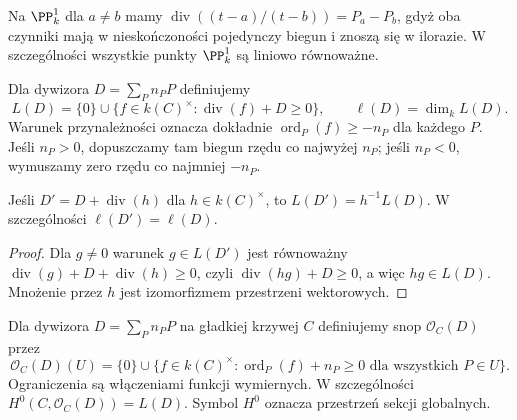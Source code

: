 \begin{przyklad}
Na $\PP^1_k$ dla $a\ne b$ mamy
$\operatorname{div}((t-a)/(t-b))=P_a-P_b$,
gdyż oba czynniki mają w nieskończoności
pojedynczy biegun i znoszą się w ilorazie.
W szczególności wszystkie punkty $\PP^1_k$
są liniowo równoważne.
\end{przyklad}

\begin{definicja}
Dla dywizora $D=\sum_Pn_PP$ definiujemy
\[
 L(D)=\{0\}\cup\{f\in k(C)^\times:
 \operatorname{div}(f)+D\ge0\},\qquad
 \ell(D)=\dim_k L(D).
\]
Warunek przynależności oznacza dokładnie
$\operatorname{ord}_P(f)\ge-n_P$ dla każdego $P$.
Jeśli $n_P>0$, dopuszczamy tam biegun rzędu
co najwyżej $n_P$; jeśli $n_P<0$, wymuszamy
zero rzędu co najmniej $-n_P$.
\end{definicja}

\begin{stwierdzenie}
Jeśli $D'=D+\operatorname{div}(h)$ dla
$h\in k(C)^\times$, to
$L(D')=h^{-1}L(D)$. W szczególności
$\ell(D')=\ell(D)$.
\end{stwierdzenie}
\begin{proof}
Dla $g\ne0$ warunek $g\in L(D')$ jest równoważny
$\operatorname{div}(g)+D+\operatorname{div}(h)\ge0$,
czyli $\operatorname{div}(hg)+D\ge0$, a więc
$hg\in L(D)$. Mnożenie przez $h$ jest
izomorfizmem przestrzeni wektorowych.
\end{proof}

\begin{definicja}
\label{def:O-D}
Dla dywizora $D=\sum_Pn_PP$ na gładkiej krzywej
$C$ definiujemy snop $\mathcal O_C(D)$ przez
\[
 \mathcal O_C(D)(U)=\{0\}\cup\{f\in k(C)^\times:
 \operatorname{ord}_P(f)+n_P\ge0
 \text{ dla wszystkich }P\in U\}.
\]
Ograniczenia są włączeniami funkcji wymiernych.
W szczególności $H^0(C,\mathcal O_C(D))=L(D)$.
Symbol $H^0$ oznacza przestrzeń sekcji globalnych.
\end{definicja}

